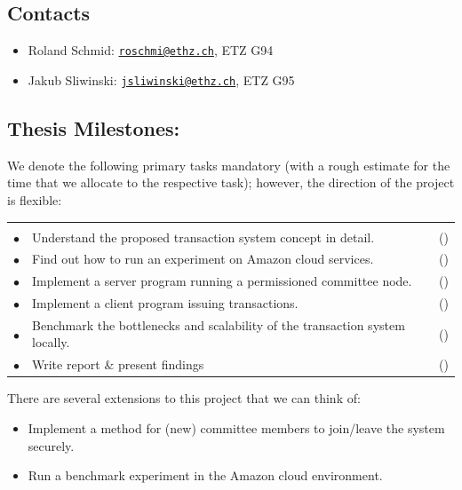 \documentclass[a4paper,11pt]{article}
\newenvironment{reqlist}{\par \medskip \noindent \begin{tabular}{cp{0.83\textwidth}r} \\[-24pt]}{\end{tabular}}
\newcommand\req{\\ \smallskip \smallskip \hspace{0.24cm} $\bullet$\hspace{-0.2cm} & }
\newcounter{num}
\newcommand\effort[1]{\mbox{(\forloop{num}{0}{\value{num} < #1}{$\star$})}}
\begin{document}

\subsection*{Contacts}
\begin{itemize}
	\item Roland Schmid: \href{mailto:Roland Schmid <roschmi@ethz.ch>}{\texttt{roschmi@ethz.ch}}, ETZ G94
	\item Jakub Sliwinski: \href{mailto:Jakub Sliwinski <jsliwinski@ethz.ch>}{\texttt{jsliwinski@ethz.ch}}, ETZ G95
\end{itemize}

\newpage


\subsection*{Thesis Milestones:}
We denote the following primary tasks mandatory (with a rough estimate for the time that we allocate to the respective task); however, the direction of the project is flexible:
\begin{reqlist}
    \req Understand the proposed transaction system concept in detail. & \effort{1}
    \req Find out how to run an experiment on Amazon cloud services. & \effort{1}
    \req Implement a server program running a permissioned committee node. & \effort{4}
    \req Implement a client program issuing transactions. & \effort{2}
    \req Benchmark the bottlenecks and scalability of the transaction system locally. & \effort{2}
    \req Write report \& present findings & \effort{2}
\end{reqlist}

\vspace{5mm}

\noindent
There are several extensions to this project that we can think of:
\begin{itemize}
    \item Implement a method for (new) committee members to join/leave the system securely.
    \item Run a benchmark experiment in the Amazon cloud environment.
\end{itemize}
\end{document}
